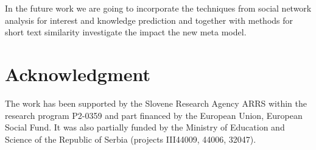 \documentclass[conference]{IEEEtran}
\begin{document}
In the future work we are going to incorporate the techniques from social network analysis for interest and knowledge prediction and together with methods for short text similarity investigate the impact the new meta model.






\section*{Acknowledgment}
The work has been supported by the Slovene Research Agency ARRS within the research program P2-0359 and part financed by the European Union, European Social Fund. It was also partially funded by the Ministry of Education and Science of the Republic of Serbia (projects III44009, 44006, 32047).









%






\end{document}

